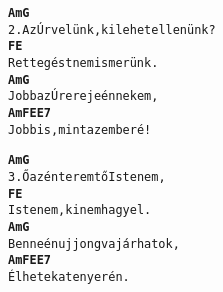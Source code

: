 \begin{minipage}{\textwidth}
\kottastart
{}
\kottaend
\begin{minipage}{\textwidth}
\begin{multicols}{2}
\begin{minipage}{\textwidth}
\begin{alltt}
\textbf{   Am                     G}
2. Az Úr velünk, ki lehet ellenünk?
\textbf{    F                 E}
   Rettegést nem ismerünk.
\textbf{    Am              G}
   Jobb az Úr ereje énnekem,
\textbf{    Am       F           E  E7}
   Jobb is, mint az emberé!
\end{alltt}
\vspace{0.0cm}
\versszakspacing
\end{minipage}
\begin{minipage}{\textwidth}
\begin{alltt}
\textbf{   Am              G}
3. Ő az én teremtő Istenem,
\textbf{   F                    E}
   Istenem, ki nem hagy el.
\textbf{    Am                G}
   Benne én ujjongva járhatok,
\textbf{   Am   F          E  E7}
   Élhetek a tenyerén.
\end{alltt}
\vspace{0.0cm}
\versszakspacing
\end{minipage}
\vspace{0.2cm}
\end{multicols}
\end{minipage}

\end{minipage}
~\vspace{1.0cm}
\newline
